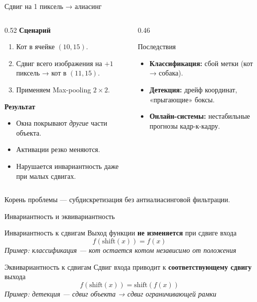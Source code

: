 \documentclass[aspectratio=169]{beamer}
\begin{document}
\begin{frame}{Сдвиг на 1 пиксель → алиасинг}
    \begin{columns}[T]
        \begin{column}{0.52\textwidth}
            \textbf{Сценарий}
            \begin{enumerate}
                \item Кот в ячейке $(10,15)$.
                \item Сдвиг всего изображения на $+1$ пиксель → кот в $(11,15)$.
                \item Применяем Max-pooling $2\times2$.
            \end{enumerate}

            \vspace{0.2cm}
            \textbf{Результат}
            \begin{itemize}
                \item Окна покрывают \emph{другие} части объекта.
                \item Активации резко меняются.
                \item Нарушается инвариантность даже при малых сдвигах.
            \end{itemize}
        \end{column}
        \begin{column}{0.46\textwidth}
            \begin{alertblock}{Последствия}
                \begin{itemize}
                    \item \textbf{Классификация:} сбой метки (кот → собака).
                    \item \textbf{Детекция:} дрейф координат, «прыгающие» боксы.
                    \item \textbf{Онлайн-системы:} нестабильные прогнозы кадр-к-кадру.
                \end{itemize}
            \end{alertblock}
        \end{column}
    \end{columns}

    \vspace{0.3cm}
    Корень проблемы — субдискретизация без антиалиасинговой фильтрации.
\end{frame}

\begin{frame}{Инвариантность и эквивариантность}
    \begin{block}{Инвариантность к сдвигам}
        Выход функции \textbf{не изменяется} при сдвиге входа
        $$f(\text{shift}(x)) = f(x)$$
        \textit{Пример: классификация — кот остается котом независимо от положения}
    \end{block}
    
    \begin{block}{Эквивариантность к сдвигам}
        Сдвиг входа приводит к \textbf{соответствующему сдвигу} выхода
        $$f(\text{shift}(x)) = \text{shift}(f(x))$$
        \textit{Пример: детекция — сдвиг объекта → сдвиг ограничивающей рамки}
    \end{block}
\end{frame}
\end{document}
